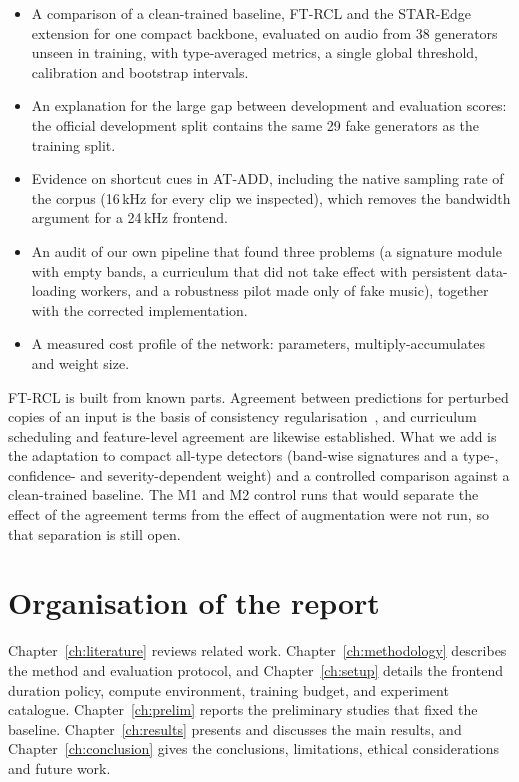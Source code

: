 \begin{itemize}
  \item A comparison of a clean-trained baseline, FT-RCL and the STAR-Edge extension for one compact backbone, evaluated on audio from 38 generators unseen in training, with type-averaged metrics, a single global threshold, calibration and bootstrap intervals.
  \item An explanation for the large gap between development and evaluation scores: the official development split contains the same 29 fake generators as the training split.
  \item Evidence on shortcut cues in AT-ADD, including the native sampling rate of the corpus (16\,kHz for every clip we inspected), which removes the bandwidth argument for a 24\,kHz frontend.
  \item An audit of our own pipeline that found three problems (a signature module with empty bands, a curriculum that did not take effect with persistent data-loading workers, and a robustness pilot made only of fake music), together with the corrected implementation.
  \item A measured cost profile of the network: parameters, multiply-accumulates and weight size.
\end{itemize}

FT-RCL is built from known parts. Agreement between predictions for perturbed copies of an input is the basis of consistency regularisation~\cite{xie2020uda,hendrycks2020augmix}, and curriculum scheduling and feature-level agreement are likewise established. What we add is the adaptation to compact all-type detectors (band-wise signatures and a type-, confidence- and severity-dependent weight) and a controlled comparison against a clean-trained baseline. The M1 and M2 control runs that would separate the effect of the agreement terms from the effect of augmentation were not run, so that separation is still open.

\section{Organisation of the report}

Chapter~\ref{ch:literature} reviews related work. Chapter~\ref{ch:methodology} describes the method and evaluation protocol, and Chapter~\ref{ch:setup} details the frontend duration policy, compute environment, training budget, and experiment catalogue. Chapter~\ref{ch:prelim} reports the preliminary studies that fixed the baseline. Chapter~\ref{ch:results} presents and discusses the main results, and Chapter~\ref{ch:conclusion} gives the conclusions, limitations, ethical considerations and future work.
